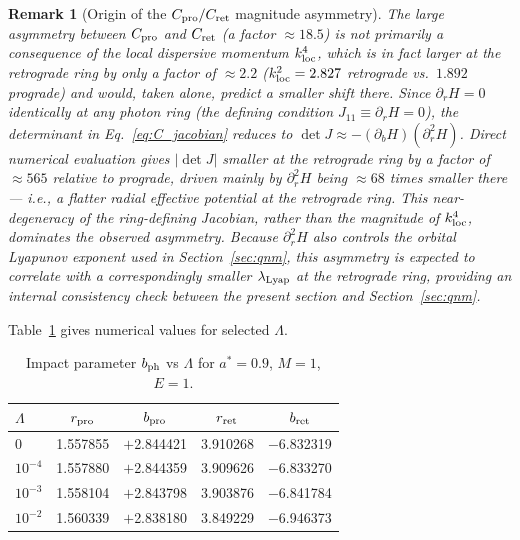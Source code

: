 \documentclass[12pt,a4paper]{article}
\newtheorem{remark}{Remark}
\begin{document}
\begin{remark}[Origin of the $C_{\rm pro}/C_{\rm ret}$ magnitude asymmetry]
\label{rem:asymmetry}
The large asymmetry between $C_{\rm pro}$ and $C_{\rm ret}$
(a factor $\approx18.5$) is \emph{not} primarily a consequence of the
local dispersive momentum $k_{\rm loc}^4$, which is in fact larger
at the retrograde ring by only a factor of $\approx2.2$
($k_{\rm loc}^2=2.827$ retrograde vs.\ $1.892$ prograde) and would,
taken alone, predict a \emph{smaller} shift there. Since
$\partial_r H=0$ identically at any photon ring
(the defining condition $J_{11}\equiv\partial_r H=0$), the
determinant in Eq.~\eqref{eq:C_jacobian} reduces to
$\det J\approx-(\partial_b H)(\partial_r^2 H)$. Direct numerical
evaluation gives $|\det J|$ smaller at the retrograde ring by a
factor of $\approx565$ relative to prograde, driven mainly by
$\partial_r^2 H$ being $\approx68$ times smaller there --- i.e., a
flatter radial effective potential at the retrograde ring. This
near-degeneracy of the ring-defining Jacobian, rather than the
magnitude of $k_{\rm loc}^4$, dominates the observed asymmetry.
Because $\partial_r^2 H$ also controls the orbital Lyapunov exponent
used in Section~\ref{sec:qnm}, this asymmetry is expected to
correlate with a correspondingly smaller $\lambda_{\rm Lyap}$ at the
retrograde ring, providing an internal consistency check between the
present section and Section~\ref{sec:qnm}.
\end{remark}

Table~\ref{tab:pring} gives numerical values for selected $\Lambda$.

\begin{table}[h]
\centering
\caption{Impact parameter $b_{\rm ph}$ vs $\Lambda$ for $a^*=0.9$, $M=1$, $E=1$.}
\label{tab:pring}
\begin{tabular}{lcccc}
\toprule
$\Lambda$ & $r_{\rm pro}$ & $b_{\rm pro}$ & $r_{\rm ret}$ & $b_{\rm ret}$ \\
\midrule
$0$        & 1.557855 & $+$2.844421 & 3.910268 & $-$6.832319 \\
$10^{-4}$  & 1.557880 & $+$2.844359 & 3.909626 & $-$6.833270 \\
$10^{-3}$  & 1.558104 & $+$2.843798 & 3.903876 & $-$6.841784 \\
$10^{-2}$  & 1.560339 & $+$2.838180 & 3.849229 & $-$6.946373 \\
\bottomrule
\end{tabular}
\end{table}

\end{document}
